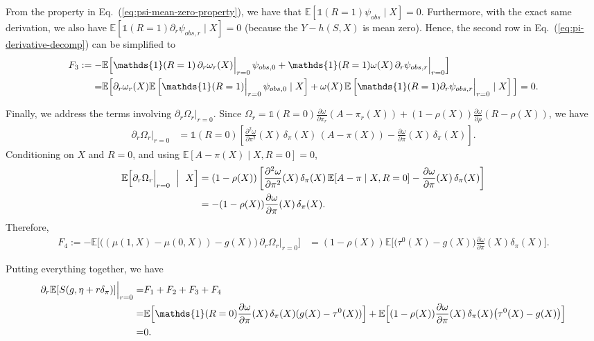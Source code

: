 \documentclass{article}
\theoremstyle{plain}
\theoremstyle{definition}
\theoremstyle{remark}
\newcommand{\E}{\mathbb{E}}                %
\newcommand{\1}{\mathds{1}}                %
\begin{document}
From the property in Eq.~(\ref{eq:psi-mean-zero-property}), we have that $\E\left[\1(R=1)\psi_{obs}\mid X\right] = 0$. Furthermore, with the exact same derivation, we also have $\E\left[\1(R=1)\partial_r\psi_{obs,r} \mid X\right] = 0$ (because the $Y-h(S,X)$ is mean zero). Hence, the second row in Eq.~(\ref{eq:pi-derivative-decomp}) can be simplified to
\begin{align}
\label{proof-paritial-pi-2}
    F_3:=-&\E\Big[\1(R=1)\,\partial_r\omega_r(X)\Big|_{r=0}\,\psi_{obs,0}
+\1(R=1)\omega(X)\,\partial_r\psi_{obs,r}\Big|_{r=0}\Big] \notag \\
=& \E\Big[\partial_r\omega_r(X)\E\left[\1(R=1)\Big|_{r=0}\,\psi_{obs,0}\mid X\right]
+\omega(X)\,\E\left[\1(R=1)\partial_r\psi_{obs,r}\Big|_{r=0}\mid X\right]\Big] = 0.
\end{align}

Finally, we address the terms involving $\partial_r\Omega_r|_{r=0}$.
Since $\Omega_r=\1(R=0)\frac{\partial\omega}{\partial\pi_r}(A-\pi_r(X))+(1-\rho(X))\frac{\partial\omega}{\partial\rho}(R-\rho(X))$, we have
\begin{align}
\partial_r\Omega_r\Big|_{r=0}
&=\1(R=0)\left[
\frac{\partial^2\omega}{\partial\pi^2}(X)\,\delta_\pi(X)\,(A-\pi(X))
-\frac{\partial\omega}{\partial\pi}(X)\,\delta_\pi(X)
\right].
\label{eq:Omega-pi-derivative}
\end{align}
Conditioning on $X$ and $R=0$, and using $\E[A-\pi(X)\mid X,R=0]=0$,
\begin{align}
\E\!\left[\partial_r\Omega_r\Big|_{r=0}\ \Bigm|\ X\right]
&=
(1-\rho(X))\left[
\frac{\partial^2\omega}{\partial\pi^2}(X)\,\delta_\pi(X)\,\E[A-\pi\mid X,R=0]
-\frac{\partial\omega}{\partial\pi}(X)\,\delta_\pi(X)
\right] \notag\\
&=-(1-\rho(X))\frac{\partial\omega}{\partial\pi}(X)\,\delta_\pi(X).
\label{eq:Omega-pi-mean}
\end{align}
Therefore,
\begin{align}
\label{proof-NO-paritial-Omega}
F_4:=-\E\Big[\big((\mu(1,X)-\mu(0,X))-g(X)\big)\,\partial_r\Omega_r\Big|_{r=0}\Big]
&=
(1-\rho(X))\E\Big[\big(\tau^0(X)-g(X)\big)\frac{\partial\omega}{\partial\pi}(X)\delta_\pi(X)\Big].
\end{align}

Putting everything together, we have
\begin{align}
    \partial_r \E[S(g,\eta+r\delta_\pi)]\Big|_{r=0}=&F_1 + F_2+F_3+F_4 \notag \\
    =& \E\Big[\1(R=0)\frac{\partial\omega}{\partial\pi}(X)\,\delta_\pi(X) (g(X)-\tau^0(X))\Big] + \E\Big[(1-\rho(X))\frac{\partial\omega}{\partial\pi}(X)\,\delta_\pi(X)\big(\tau^0(X)-g(X)\big)\Big] \notag \\
    =&0.
\end{align}
\end{document}
